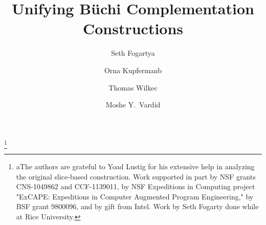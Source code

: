 \documentclass{LMCS}
\begin{document}
\title[Unifying B\"uchi Complementation Constructions]{Unifying B\"uchi Complementation Constructions}

\author[S.~Fogarty]{Seth Fogarty\rsuper a}
\address{{\lsuper a}Computer Science Department, Trinity University, San Antonio, TX}
\thanks{{\lsuper a}The authors are grateful to Yoad Lustig for his extensive help in analyzing the original
slice-based construction.  Work supported in part by NSF grants CNS-1049862 and CCF-1139011, by NSF
Expeditions in Computing project "ExCAPE: Expeditions in Computer Augmented Program Engineering," by
BSF grant 9800096, and by gift from Intel. Work by Seth Fogarty done while at Rice University.}
\author[O.~Kupferman]{Orna Kupferman\rsuper b}
\address{{\lsuper b}School of Computer Science and Engineering, Hebrew University of Jerusalem, Israel}
\author[T.~Wilke]{Thomas Wilke\rsuper c}
\address{{\lsuper c}Institut f\"ur Informatik, Christian-Albrechts-Universit\"at zu Kiel, Kiel, Germany}
\author[M.~Y.~Vardi]{Moshe Y.~Vardi\rsuper d}
\address{{\lsuper d}Department of Computer Science, Rice University, Houston, TX}

\end{document}
